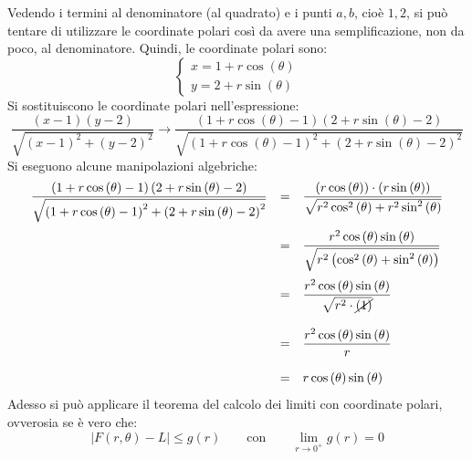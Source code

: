 \documentclass[a4paper]{article}
\begin{document}
	\noindent
	Vedendo i termini al denominatore (al quadrato) e i punti $a,b$, cioè $1,2$, si può tentare di utilizzare le coordinate polari così da avere una semplificazione, non da poco, al denominatore. Quindi, le coordinate polari sono:
	\begin{equation*}
		\begin{cases}
			x = 1 + r\cos\left(\theta\right) \\
			y = 2 + r\sin\left(\theta\right)
		\end{cases}
	\end{equation*}
	Si sostituiscono le coordinate polari nell'espressione:
	\begin{equation*}
		\dfrac{\left(x-1\right)\left(y-2\right)}{\sqrt{\left(x-1\right)^{2} + \left(y-2\right)^{2}}} 
		\rightarrow
		\dfrac{
			\left(1 + r\cos\left(\theta\right)-1\right)\left(2 + r\sin\left(\theta\right)-2\right)
		}{
			\sqrt{\left(1 + r\cos\left(\theta\right)-1\right)^{2} + \left(2 + r\sin\left(\theta\right)-2\right)^{2}}
		}
	\end{equation*}
	Si eseguono alcune manipolazioni algebriche:
	\begin{equation*}
		\begin{array}{rcl}
			\dfrac{
				\left(1 + r\cos\left(\theta\right)-1\right)\left(2 + r\sin\left(\theta\right)-2\right)
			}{
				\sqrt{\left(1 + r\cos\left(\theta\right)-1\right)^{2} + \left(2 + r\sin\left(\theta\right)-2\right)^{2}}
			}
			&=&
			\dfrac{
				\left(r\cos\left(\theta\right)\right) \cdot \left(r\sin\left(\theta\right)\right)
			}{
				\sqrt{r^{2}\cos^{2}\left(\theta\right) + r^{2}\sin^{2}\left(\theta\right)}
			} \\ [2em]
			&=&
			\dfrac{
				r^{2} \cos\left(\theta\right)\sin\left(\theta\right)
			}{
				\sqrt{r^{2}\left(\cos^{2}\left(\theta\right) + \sin^{2}\left(\theta\right)\right)}
			} \\ [2em]
			&=&
			\dfrac{
				r^{2} \cos\left(\theta\right)\sin\left(\theta\right)
			}{
				\sqrt{r^{2} \cdot \cancel{\left(1\right)}}
			} \\ [2em]
			&=&
			\dfrac{
				r^{2} \cos\left(\theta\right)\sin\left(\theta\right)
			}{
				r
			} \\ [1.5em]
			&=&
			r \cos\left(\theta\right)\sin\left(\theta\right)
		\end{array}
	\end{equation*}
	Adesso si può applicare il teorema del calcolo dei limiti con coordinate polari, ovverosia se è vero che:
	\begin{equation*}
		\left| F\left(r, \theta\right) - L \right| \le g\left(r\right) \hspace{2em} \text{con} \hspace{2em}
		\displaystyle\lim_{r \rightarrow 0^{+}} g\left(r\right) = 0
	\end{equation*}
\end{document}
